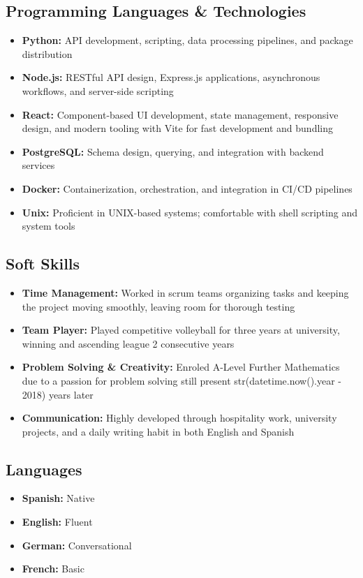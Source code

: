 \documentclass[11pt,a4paper]{article}
\begin{document}
\subsection{Programming Languages \& Technologies}
\begin{itemize}
    \item \textbf{Python:} API development, scripting, data processing pipelines, and package distribution
    \item \textbf{Node.js:} RESTful API design, Express.js applications, asynchronous workflows, and server-side scripting
    \item \textbf{React:} Component-based UI development, state management, responsive design, and modern tooling with Vite for fast development and bundling
    \item \textbf{PostgreSQL:} Schema design, querying, and integration with backend services
    \item \textbf{Docker:} Containerization, orchestration, and integration in CI/CD pipelines
    \item \textbf{Unix:} Proficient in UNIX-based systems; comfortable with shell scripting and system tools
\end{itemize}

\subsection{Soft Skills}
\begin{itemize}
    \item \textbf{Time Management:} Worked in scrum teams organizing tasks and keeping the project moving smoothly, leaving room for thorough testing
    \item \textbf{Team Player:} Played competitive volleyball for three years at university, winning and ascending league 2 consecutive years
    \item \textbf{Problem Solving \& Creativity:} Enroled A-Level Further Mathematics due to a passion for problem solving still present str(datetime.now().year - 2018) years later
    \item \textbf{Communication:} Highly developed through hospitality work, university projects, and a daily writing habit in both English and Spanish
\end{itemize}

\subsection{Languages}
\begin{itemize}
    \item \textbf{Spanish:} Native
    \item \textbf{English:} Fluent
    \item \textbf{German:} Conversational
    \item \textbf{French:} Basic
\end{itemize}
\end{document}
